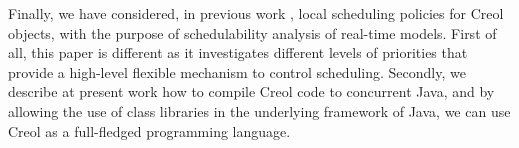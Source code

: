 Finally, we have considered, in previous work \cite{jaghoori_dating}, local
scheduling policies for Creol objects, with the purpose of schedulability
analysis of real-time models. First of all, this paper is different as it
investigates different levels of priorities that provide a high-level flexible
mechanism to control scheduling. Secondly, we describe at present work how to
compile Creol code to concurrent Java, and by allowing the use of class
libraries
in the underlying framework of Java, we can use Creol as a full-fledged
programming language. %





%

